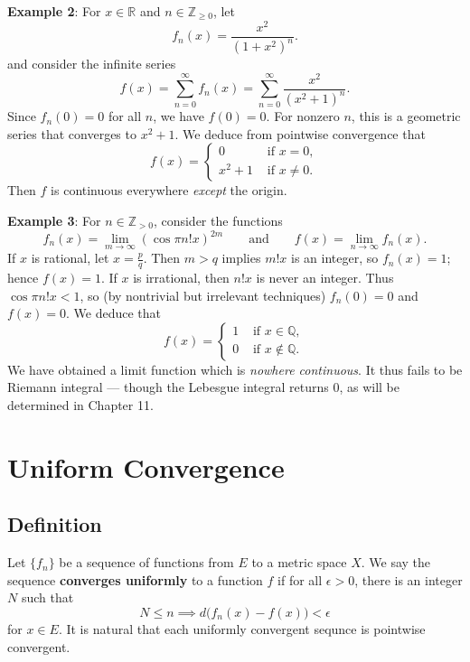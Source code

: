 \documentclass[11pt]{article}
\begin{document}
\textbf{Example 2}: For $x \in \mathbb{R}$ and $n \in \mathbb{Z}_{\ge 0}$, let
\[
	f_{n}(x) = \frac{x^{2}}{(1 + x^{2})^{n}}.
\]
and consider the infinite series
\[
	f(x) = \sum\limits_{n = 0}^{\infty} f_{n}(x) = \sum\limits_{n = 0}^{\infty} \frac{x^{2}}{(x^{2} + 1)^{n}}.
\]
Since $f_{n}(0) = 0$ for all $n$, we have $f(0) = 0$. For nonzero $n$, this is a geometric series that converges to $x^{2} + 1$. We deduce from pointwise convergence that
\[
	f(x) = 
	\begin{cases}
		0 & \text{ if } x = 0, \\
		x^{2} + 1 & \text{ if } x \ne 0.
	\end{cases}
\]
Then $f$ is continuous everywhere \textit{except} the origin.

\textbf{Example 3}: For $n \in \mathbb{Z}_{> 0}$, consider the functions
\[
	f_{n}(x) = \lim\limits_{m \to \infty} (\cos \pi n! x )^{2m} \qquad \text{and} \qquad f(x) = \lim\limits_{n \to \infty} f_{n}(x).
\]
If $x$ is rational, let $x = \tfrac{p}{q}$. Then $m > q$ implies $m! x$ is an integer, so $f_{n}(x) = 1$; hence $f(x) = 1$. If $x$ is irrational, then $n! x$ is never an integer. Thus $\cos \pi n! x < 1$, so (by nontrivial but irrelevant techniques) $f_{n}(0) = 0$ and $f(x) = 0$. We deduce that
\[
	f(x) = 
	\begin{cases}
		1 & \text{ if } x \in \mathbb{Q}, \\
		0 & \text{ if } x \notin \mathbb{Q}.
	\end{cases}
\]
We have obtained a limit function which is \textit{nowhere continuous}. It thus fails to be Riemann integral --- though the Lebesgue integral returns $0$, as will be determined in Chapter 11.


\section{Uniform Convergence}


\subsection{Definition}

Let $\{ f_{n} \}$ be a sequence of functions from $E$ to a metric space $X$. We say the sequence \textbf{converges uniformly} to a function $f$ if for all $\epsilon > 0$, there is an integer $N$ such that
\[
	N \le n \implies d \big( f_{n}(x) - f(x) \big) < \epsilon
\]
for  $x \in E$. It is natural that each uniformly convergent sequnce is pointwise convergent.
\end{document}
